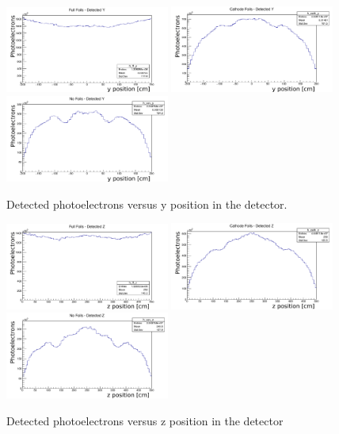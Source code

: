 \documentclass[a4paper]{article}
\begin{document}
  \begin{figure}[H]
    \center
    \includegraphics[width=0.48\textwidth]{detected_fullfoils_y_labels.pdf}
    \includegraphics[width=0.48\textwidth]{detected_cathode_y_labels.pdf}
    \includegraphics[width=0.48\textwidth]{detected_nofoils_y_labels.pdf}
    \caption{Detected photoelectrons versus y position in the detector.}\label{y_pos}
  \end{figure}
  
    \begin{figure}[H]
    \center
    \includegraphics[width=0.48\textwidth]{detected_fullfoils_z_labels.pdf}
    \includegraphics[width=0.48\textwidth]{detected_cathode_z_labels.pdf}
    \includegraphics[width=0.48\textwidth]{detected_nofoils_z_labels.pdf}
    \caption{Detected photoelectrons versus z position in the detector}\label{z_pos}
  \end{figure}
\end{document}
